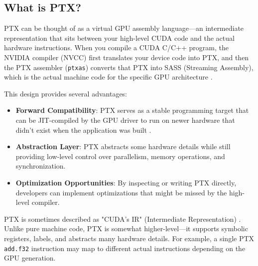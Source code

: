 \subsection{What is PTX?}

PTX can be thought of as a virtual GPU assembly language—an intermediate representation that sits between your high-level CUDA code and the actual hardware instructions. When you compile a CUDA C/C++ program, the NVIDIA compiler (NVCC) first translates your device code into PTX, and then the PTX assembler (\texttt{ptxas}) converts that PTX into SASS (Streaming Assembly), which is the actual machine code for the specific GPU architecture \citep{nvidia_ptx_blog}.

        

This design provides several advantages:

\begin{itemize}
    \item \textbf{Forward Compatibility}: PTX serves as a stable programming target that can be JIT-compiled by the GPU driver to run on newer hardware that didn't exist when the application was built \citep{nvidia_ptx_blog}.
    
    \item \textbf{Abstraction Layer}: PTX abstracts some hardware details while still providing low-level control over parallelism, memory operations, and synchronization.
    
    \item \textbf{Optimization Opportunities}: By inspecting or writing PTX directly, developers can implement optimizations that might be missed by the high-level compiler.
\end{itemize}

PTX is sometimes described as "CUDA's IR" (Intermediate Representation) \citep{bruce_lee_tensor_core}. Unlike pure machine code, PTX is somewhat higher-level—it supports symbolic registers, labels, and abstracts many hardware details. For example, a single PTX \texttt{add.f32} instruction may map to different actual instructions depending on the GPU generation.

